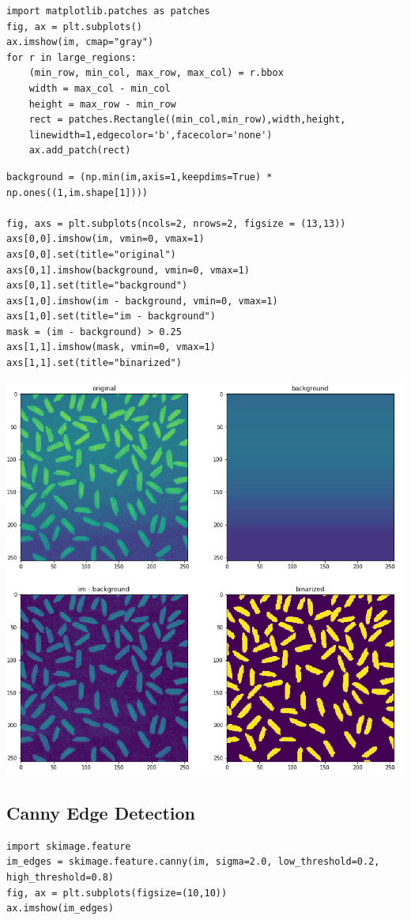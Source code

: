 \begin{verbatim}
import matplotlib.patches as patches
fig, ax = plt.subplots()
ax.imshow(im, cmap="gray")
for r in large_regions:
	(min_row, min_col, max_row, max_col) = r.bbox
	width = max_col - min_col
	height = max_row - min_row
	rect = patches.Rectangle((min_col,min_row),width,height,
	linewidth=1,edgecolor='b',facecolor='none')
	ax.add_patch(rect)
\end{verbatim}

\begin{verbatim}
background = (np.min(im,axis=1,keepdims=True) * np.ones((1,im.shape[1])))

fig, axs = plt.subplots(ncols=2, nrows=2, figsize = (13,13))
axs[0,0].imshow(im, vmin=0, vmax=1)
axs[0,0].set(title="original")
axs[0,1].imshow(background, vmin=0, vmax=1)
axs[0,1].set(title="background")
axs[1,0].imshow(im - background, vmin=0, vmax=1)
axs[1,0].set(title="im - background")
mask = (im - background) > 0.25
axs[1,1].imshow(mask, vmin=0, vmax=1)
axs[1,1].set(title="binarized")
\end{verbatim}
\begin{center}
	\includegraphics[width=0.7\linewidth]{img/BinarizedRiceGrains}
\end{center}


\subsection{Canny Edge Detection}
\begin{verbatim}
import skimage.feature
im_edges = skimage.feature.canny(im, sigma=2.0, low_threshold=0.2, high_threshold=0.8)
fig, ax = plt.subplots(figsize=(10,10))
ax.imshow(im_edges)
\end{verbatim}



